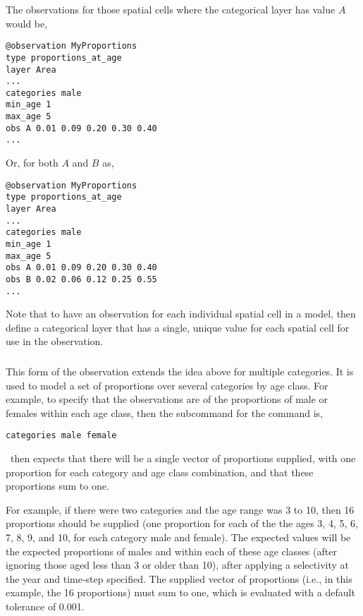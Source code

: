 The observations for those spatial cells where the categorical layer has value $A$ would be, 

{\small{\begin{verbatim}
@observation MyProportions
type proportions_at_age
layer Area
...
categories male
min_age 1
max_age 5
obs A 0.01 0.09 0.20 0.30 0.40
...
\end{verbatim}}}

Or, for both $A$ and $B$ as,

{\small{\begin{verbatim}
@observation MyProportions
type proportions_at_age
layer Area
...
categories male
min_age 1
max_age 5
obs A 0.01 0.09 0.20 0.30 0.40
obs B 0.02 0.06 0.12 0.25 0.55
...
\end{verbatim}

Note that to have an observation for each individual spatial cell in a model, then define a categorical layer that has a single, unique value for each spatial cell for use in the observation. 

\subsubsection*{}

This form of the observation extends the idea above for multiple categories. It is used to model a set of proportions over several categories by age class. For example, to specify that the observations are of the proportions of male or females within each age class, then the subcommand  for the  command is,

{\small{\begin{verbatim}
categories male female
\end{verbatim}}}

\SPM\ then expects that there will be a single vector of proportions supplied, with one proportion for each category and age class combination, and that these proportions sum to one. 

For example, if there were two categories and the age range was 3 to 10, then 16 proportions should be supplied (one proportion for each of the the ages 3, 4, 5, 6, 7, 8, 9, and 10, for each category male and female). The expected values will be the expected proportions of males and within each of these age classes (after ignoring those aged less than 3 or older than 10), after applying a selectivity at the year and time-step specified. The supplied vector of proportions (i.e., in this example, the 16 proportions) must sum to one, which is evaluated with a default tolerance of 0.001. 

}}
